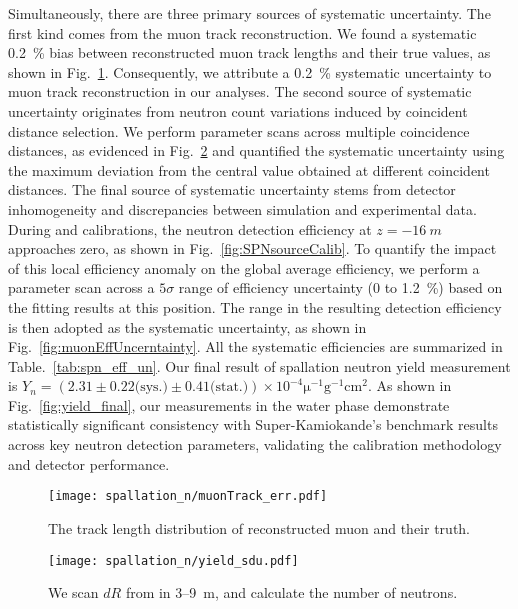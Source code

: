 Simultaneously, there are three primary sources of systematic uncertainty. The first kind comes from the muon track reconstruction. We found a systematic \SI{0.2}{\%} bias between reconstructed muon track lengths and their true values, as shown in Fig.~\ref{fig:muontrackUncerntainty}. Consequently, we attribute a \SI{0.2}{\%} systematic uncertainty to muon track reconstruction in our analyses.
The second source of systematic uncertainty originates from neutron count variations induced by coincident distance selection. We perform parameter scans across multiple coincidence distances, as evidenced in Fig.~\ref{fig:muonCountUncerntainty} and quantified the systematic uncertainty using the maximum deviation from the central value obtained at different coincident distances.
The final source of systematic uncertainty stems from detector inhomogeneity and discrepancies between simulation and experimental data. During  and  calibrations, the neutron detection efficiency at $z = \SI{-16}{m}$ approaches zero, as shown in Fig.~\ref{fig:SPNsourceCalib}. To quantify the impact of this local efficiency anomaly on the global average efficiency, we perform a parameter scan across a $5\sigma$ range of efficiency uncertainty (0 to \SI{1.2}{\%}) based on the fitting results at this position. The range in the resulting detection efficiency is then adopted as the systematic uncertainty, as shown in Fig.~\ref{fig:muonEffUncerntainty}. All the systematic efficiencies are summarized in Table.~\ref{tab:spn_eff_un}. Our final result of spallation neutron yield measurement is $Y_n = (2.31\pm0.22\text{(sys.)}\pm0.41 \text{(stat.)}) \times 10^{-4}\mathrm{\mu}^{-1}\text{g}^{-1}\text{cm}^2$. As shown in Fig.~\ref{fig:yield_final}, our measurements in the water phase demonstrate statistically significant consistency with Super-Kamiokande's benchmark results across key neutron detection parameters, validating the calibration methodology and detector performance.
\begin{figure}[htbp]
	\centering
	\texttt{[image: spallation\_n/muonTrack\_err.pdf]}
	\caption{The track length distribution of reconstructed muon and their truth.}
	\label{fig:muontrackUncerntainty}
\end{figure}

\begin{figure}[htbp]
	\centering
	\texttt{[image: spallation\_n/yield\_sdu.pdf]}
	\caption{We scan $dR$ from in 3--\SI{9}{m}, and calculate the number of neutrons.}
	\label{fig:muonCountUncerntainty}
\end{figure}

